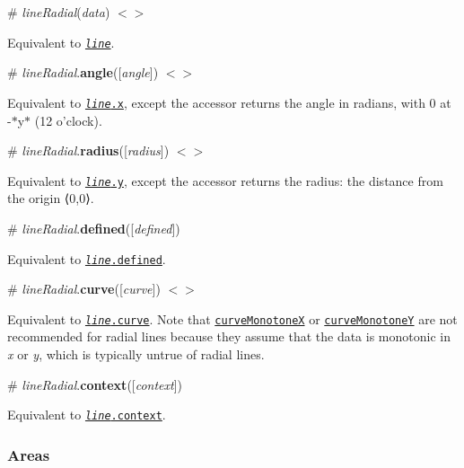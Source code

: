 \label{__lineRadial}%
\# {\itshape line\+Radial}({\itshape data}) \href{https://github.com/d3/d3-shape/blob/master/src/lineRadial.js#L4}{\tt $<$$>$}

Equivalent to \href{#_line}{\tt {\itshape line}}.

\label{_lineRadial_angle}%
\# {\itshape line\+Radial}.{\bfseries angle}(\mbox{[}{\itshape angle}\mbox{]}) \href{https://github.com/d3/d3-shape/blob/master/src/lineRadial.js#L7}{\tt $<$$>$}

Equivalent to \href{#line_x}{\tt {\itshape line}.x}, except the accessor returns the angle in radians, with 0 at -\/$\ast$y$\ast$ (12 o’clock).

\label{_lineRadial_radius}%
\# {\itshape line\+Radial}.{\bfseries radius}(\mbox{[}{\itshape radius}\mbox{]}) \href{https://github.com/d3/d3-shape/blob/master/src/lineRadial.js#L8}{\tt $<$$>$}

Equivalent to \href{#line_y}{\tt {\itshape line}.y}, except the accessor returns the radius\+: the distance from the origin ⟨0,0⟩.

\label{_lineRadial_defined}%
\# {\itshape line\+Radial}.{\bfseries defined}(\mbox{[}{\itshape defined}\mbox{]})

Equivalent to \href{#line_defined}{\tt {\itshape line}.defined}.

\label{_lineRadial_curve}%
\# {\itshape line\+Radial}.{\bfseries curve}(\mbox{[}{\itshape curve}\mbox{]}) \href{https://github.com/d3/d3-shape/blob/master/src/lineRadial.js#L10}{\tt $<$$>$}

Equivalent to \href{#line_curve}{\tt {\itshape line}.curve}. Note that \href{#curveMonotoneX}{\tt curve\+MonotoneX} or \href{#curveMonotoneY}{\tt curve\+MonotoneY} are not recommended for radial lines because they assume that the data is monotonic in {\itshape x} or {\itshape y}, which is typically untrue of radial lines.

\label{_lineRadial_context}%
\# {\itshape line\+Radial}.{\bfseries context}(\mbox{[}{\itshape context}\mbox{]})

Equivalent to \href{#line_context}{\tt {\itshape line}.context}.

\subsubsection*{Areas}

\href{http://bl.ocks.org/mbostock/3883195}{\tt }\href{http://bl.ocks.org/mbostock/3885211}{\tt }\href{http://bl.ocks.org/mbostock/3894205}{\tt }

